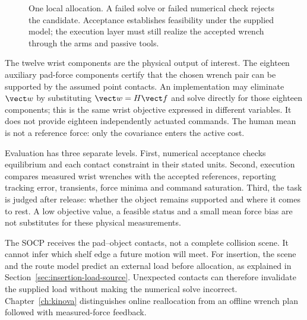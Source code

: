 \begin{figure}[htbp]\centering
{}
\caption{One local allocation. A failed solve or failed numerical check rejects the candidate. Acceptance establishes feasibility under the supplied model; the execution layer must still realize the accepted wrench through the arms and passive tools.}
\label{fig:socp-blocks}
\end{figure}

The twelve wrist components are the physical output of interest. The eighteen auxiliary pad-force components certify that the chosen wrench pair can be supported by the assumed point contacts. An implementation may eliminate $\vect w$ by substituting $\vect w=H\vect f$ and solve directly for those eighteen components; this is the same wrist objective expressed in different variables. It does not provide eighteen independently actuated commands. The human mean is not a reference force: only the covariance enters the active cost.

Evaluation has three separate levels. First, numerical acceptance checks equilibrium and each contact constraint in their stated units. Second, execution compares measured wrist wrenches with the accepted references, reporting tracking error, transients, force minima and command saturation. Third, the task is judged after release: whether the object remains supported and where it comes to rest. A low objective value, a feasible status and a small mean force bias are not substitutes for these physical measurements.

The SOCP receives the pad--object contacts, not a complete collision scene. It cannot infer which shelf edge a future motion will meet. For insertion, the scene and the route model predict an external load before allocation, as explained in Section~\ref{sec:insertion-load-source}. Unexpected contacts can therefore invalidate the supplied load without making the numerical solve incorrect. Chapter~\ref{ch:kinova} distinguishes online reallocation from an offline wrench plan followed with measured-force feedback.


